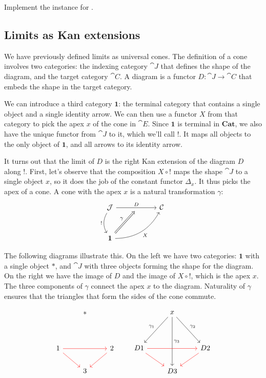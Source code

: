 \documentclass[DaoFP]{subfiles}
\begin{document}
\begin{exercise}
Implement the  instance for .
\end{exercise}

\subsection{Limits as Kan extensions}
 We have previously defined limits as universal cones. The definition of a cone involves two categories: the indexing category $\cat J$ that defines the shape of the diagram, and the target category $\cat C$. A diagram is a functor $D \colon \cat J \to \cat C$ that embeds the shape in the target category. 
 
 We can introduce a third category $\mathbf 1$: the terminal category that contains a single object and a single identity arrow. We can then use a functor $X$ from that category to pick the apex $x$ of the cone in $\cat E$. Since $\mathbf 1$ is terminal in $\mathbf{Cat}$, we also have the unique functor from $\cat J$ to it, which we'll call $!$. It maps all objects to the only object of $\mathbf 1$, and all arrows to its identity arrow.
 
It turns out that the limit of $D$ is the right Kan extension of the diagram $D$ along $!$. First, let's observe that the composition $X \circ !$ maps the shape $\cat J$ to a single object $x$, so it does the job of the constant functor $\Delta_x$. It thus picks the apex of a cone. A cone with the apex $x$ is a natural transformation $\gamma$: 
\[
 \begin{tikzcd} [row sep=1cm, column sep=1cm]
 \cat J
 \arrow[rr, "D", "" {name=ID, below} ]
 \arrow[d, bend right, "!"']
 && \cat C
 \\
 \mathbf 1
  \arrow[urr, bend right, "X"']
 \arrow[Rightarrow, "\gamma",  to=ID]
 \end{tikzcd}
\]

The following diagrams illustrate this. On the left we have two categories: $\mathbf 1$ with a single object $*$, and $\cat J$ with three objects forming the shape for the diagram. On the right we have the image of $D$ and the image of $X \circ !$, which is the apex $x$. The three components of $\gamma$ connect the apex $x$ to the diagram. Naturality of $\gamma$ ensures that the triangles that form the sides of the cone commute.

\[
 \begin{tikzcd}
  & *
 \\
\\
1 
\arrow[rr, red]
\arrow[rd, red]
&& 2
\arrow[dl, red]
\\
& 3
 \end{tikzcd}
 \qquad
 \begin{tikzcd}
  & x
\arrow[ddr, "\gamma_2"]
 \arrow[ddl, "\gamma_1"']
 \arrow[ddd, "\gamma_3"]
 \\
\\
D 1 
\arrow[rr, red]
\arrow[rd, red]
&& D 2
\arrow[dl, red]
\\
& D 3
 \end{tikzcd}
 \]
\end{document}
